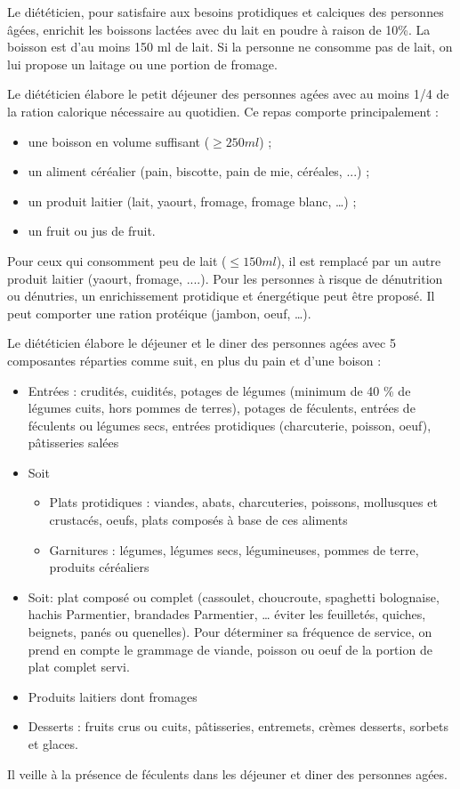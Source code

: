 Le diététicien, pour satisfaire aux besoins protidiques et calciques des personnes âgées, enrichit les boissons lactées avec du lait en poudre à raison de 10\%. La boisson est d’au moins 150 ml de lait. Si la personne ne consomme pas de lait, on lui propose un laitage ou une portion de fromage.

Le diététicien élabore le petit déjeuner des personnes agées avec au moins 1/4 de la ration calorique nécessaire au quotidien. Ce repas comporte principalement :
\begin{itemize}
 \item une boisson en volume suffisant ($\ge 250 ml$) ;
 \item un aliment céréalier (pain, biscotte, pain de mie, céréales, ...) ;
 \item un produit laitier (lait, yaourt, fromage, fromage blanc, …) ;
 \item un fruit ou jus de fruit.
\end{itemize}
Pour ceux qui consomment peu de lait ($\le 150 ml$), il est remplacé par un autre produit laitier (yaourt, fromage, ....). Pour les personnes à risque de dénutrition ou dénutries, un enrichissement protidique et énergétique peut être proposé. Il peut comporter une ration protéique (jambon, oeuf, …).

Le diététicien élabore le déjeuner et le diner des personnes agées avec 5 composantes réparties comme suit, en plus du pain et d'une boison :
\begin{itemize}
 \item Entrées : crudités, cuidités, potages de légumes (minimum de 40 \% de légumes cuits, hors pommes de terres), potages de féculents, entrées de féculents ou légumes secs, entrées protidiques (charcuterie, poisson, oeuf), pâtisseries salées
 \item Soit
 \begin{itemize}
  \item Plats protidiques : viandes, abats, charcuteries, poissons, mollusques et crustacés, oeufs, plats composés à base de ces aliments
  \item Garnitures : légumes, légumes secs, légumineuses, pommes de terre, produits céréaliers
 \end{itemize}
 \item Soit: plat composé ou complet (cassoulet, choucroute, spaghetti bolognaise, hachis Parmentier, brandades Parmentier, … éviter les feuilletés, quiches, beignets, panés ou quenelles). Pour déterminer sa fréquence de service, on prend en compte le grammage de viande, poisson ou oeuf de la portion de plat complet servi.
 \item Produits laitiers dont fromages
 \item Desserts : fruits crus ou cuits, pâtisseries, entremets, crèmes desserts, sorbets et glaces.
\end{itemize}
Il veille à la présence de féculents dans les déjeuner et diner des personnes agées.

